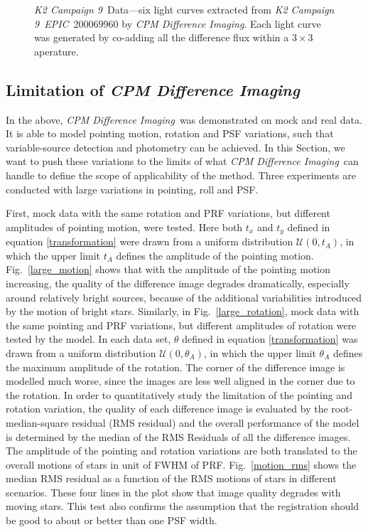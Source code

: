 \documentclass[12pt, preprint]{aastex}
\newcommand{\project}[1]{\textsl{#1}}
\newcommand{\cpmdiff}{\project{CPM Difference Imaging}}
\newcommand{\KTCN}{\project{K2 Campaign 9}}
\newcommand{\epic}{\project{EPIC}}
\begin{document}
\begin{figure}[p]
\begin{center}
\end{center}
\caption{
  \label{lightcurve}
  \KTCN\ Data---six light curves extracted from \KTCN\ \epic\ 200069960 by \cpmdiff. 
  Each light curve was generated by co-adding all the difference flux within a $3\times 3$ aperature.
}
\end{figure}


\subsection{Limitation of \cpmdiff}\label{limits}
In the above,  \cpmdiff\ was demonstrated on mock and real data. 
It is able to model pointing motion, rotation and PSF variations, such that variable-source detection and photometry can be achieved.
In this Section, we want to push these variations to the limits of what \cpmdiff\ can handle to define the scope of applicability of the method. 
Three experiments are conducted with large variations in pointing, roll and PSF.

First, mock data with the same rotation and PRF variations, but different amplitudes of pointing motion, were tested.
Here both $t_x$ and $t_y$ defined in equation \ref{transformation} were drawn from a uniform distribution ${\mathcal {U}}(0,t_A)$, in which the upper limit $t_A$ defines the amplitude of the pointing motion.
Fig.~\ref{large_motion} shows that with the amplitude of the pointing motion increasing,  the quality of the difference image degrades dramatically, especially around relatively bright sources, because of the additional variabilities introduced by the motion of bright stars.
Similarly, in Fig.~\ref{large_rotation}, mock data with the same pointing and PRF variations, but different amplitudes of rotation were tested by the model.
In each data set, $\theta$ defined in equation \ref{transformation} was drawn from a uniform distribution ${\mathcal {U}}(0,\theta_A)$, in which the upper limit $\theta_A$ defines the maximum amplitude of the rotation.
The corner of the difference image is modelled much worse, since the images are less well aligned in the corner due to the rotation. 
In order to quantitatively study the limitation of the pointing and rotation variation, the quality of each difference image is evaluated by the root-median-square residual (RMS residual) and the overall performance of the model is determined by the median of the RMS Residuals of all the difference images.
The amplitude of the pointing and rotation variations are both translated to the overall motions of stars in unit of FWHM of PRF.
Fig.~\ref{motion_rms} shows the median RMS residual as a function of the RMS motions of stars in different scenarios. 
These four lines in the plot show that image quality degrades with moving stars.
This test also confirms the assumption that the registration should be good to about or better than one PSF width.
\end{document}
